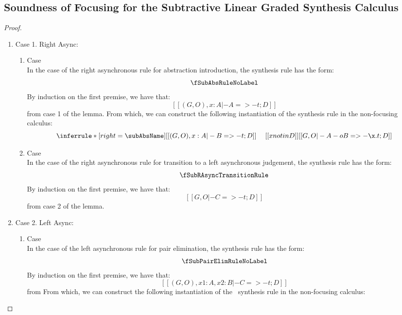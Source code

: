 
\subsection{Soundness of Focusing for the Subtractive Linear Graded Synthesis Calculus}
\label{proof:focusSubSound}
\focusSoundSub*
\begin{proof}
  \begin{enumerate}
      \item Case 1. Right Async: \\
      \begin{enumerate}
        \item Case \subAbsName \\
          In the case of the right asynchronous rule for abstraction introduction, the synthesis rule has the form:
          \[
          \fSubAbsRuleNoLabel
          \]
          By induction on the first premise, we have that:
          \[
            [[ (G , O), x : A |- A =>- t ; D ]] \tag{ih}
          \]
          from case 1 of the lemma. From which, we can construct the following instantiation of the \subAbsName synthesis rule in the non-focusing calculus:
          \[
          \inferrule*[right=\subAbsName]
          {[[(G , O), x : A |- B =>- t ; D]] \quad\; [[ x notin D ]]}{[[ G , O |- A -o B =>- \x. t ; D ]]}
          \]
    \item Case \fSubRAsyncTransitionName \\
          In the case of the right asynchronous rule for transition to a left asynchronous judgement, the synthesis rule has the form:
          \[
            \fSubRAsyncTransitionRule
          \]
          By induction on the first premise, we have that:
          \[
            [[ G , O |- C =>- t ; D ]]
          \]
          from case 2 of the lemma.
    \end{enumerate}
    \item Case 2. Left Async: \\
      \begin{enumerate}
        \item Case \subPairElimName \\
          In the case of the left asynchronous rule for pair elimination, the synthesis rule has the form:
          \[
          \fSubPairElimRuleNoLabel
          \]
          By induction on the first premise, we have that:
            \[
            [[(G , O), x1 : A, x2 : B |- C =>- t ; D]] \tag{ih}
            \]
          from From which, we can construct the following instantiation of the \subPairIntroName\ synthesis rule in the non-focusing calculus:

\end{enumerate}
\end{enumerate}
\end{proof}
